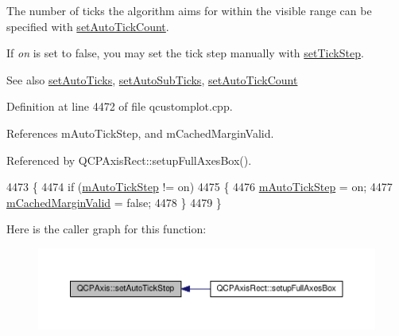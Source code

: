 The number of ticks the algorithm aims for within the visible range can be specified with \hyperlink{class_q_c_p_axis_a7c7111cbeac9ec5fcb40f93a1ef51a0b}{set\+Auto\+Tick\+Count}.

If {\itshape on} is set to false, you may set the tick step manually with \hyperlink{class_q_c_p_axis_af727db0acc6492c4c774c0700e738205}{set\+Tick\+Step}.

\begin{DoxySeeAlso}{See also}
\hyperlink{class_q_c_p_axis_ae867c23d3a6a7bd4d09cc66c5d018f63}{set\+Auto\+Ticks}, \hyperlink{class_q_c_p_axis_adcbdec7a60054b88571e89599f4a45bf}{set\+Auto\+Sub\+Ticks}, \hyperlink{class_q_c_p_axis_a7c7111cbeac9ec5fcb40f93a1ef51a0b}{set\+Auto\+Tick\+Count} 
\end{DoxySeeAlso}


Definition at line 4472 of file qcustomplot.\+cpp.



References m\+Auto\+Tick\+Step, and m\+Cached\+Margin\+Valid.



Referenced by Q\+C\+P\+Axis\+Rect\+::setup\+Full\+Axes\+Box().


\begin{DoxyCode}
4473 \{
4474   \textcolor{keywordflow}{if} (\hyperlink{class_q_c_p_axis_aada8934a5c44978653031782aa37d101}{mAutoTickStep} != on)
4475   \{
4476     \hyperlink{class_q_c_p_axis_aada8934a5c44978653031782aa37d101}{mAutoTickStep} = on;
4477     \hyperlink{class_q_c_p_axis_a2cde37b6e385f47e11322df4ac1b0e9b}{mCachedMarginValid} = \textcolor{keyword}{false};
4478   \}
4479 \}
\end{DoxyCode}


Here is the caller graph for this function\+:\nopagebreak
\begin{figure}[H]
\begin{center}
\leavevmode
\includegraphics[width=350pt]{class_q_c_p_axis_a99fe77b034e06f5b723995beab96e741_icgraph}
\end{center}
\end{figure}


\hypertarget{class_q_c_p_axis_a778d45fb71b3c7ab3bb7079e18b058e4}{}
